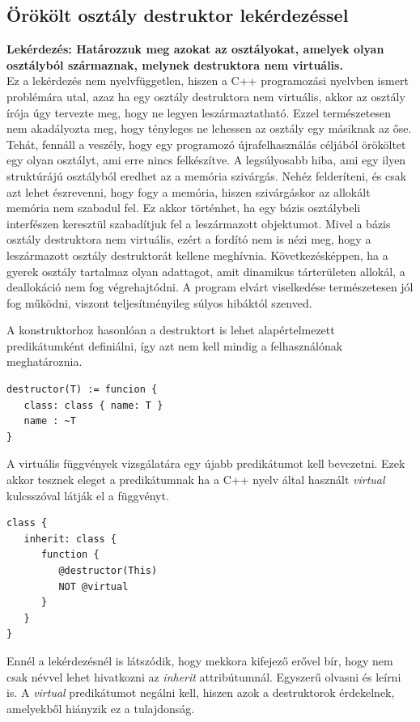 \documentclass[a4paper,12pt]{report}
\begin{document}
\subsection{Örökölt osztály destruktor lekérdezéssel}
\textbf{Lekérdezés: Határozzuk meg azokat az osztályokat, amelyek olyan osztályból származnak, melynek destruktora nem virtuális.}
\\
Ez a lekérdezés nem nyelvfüggetlen, hiszen a C++ programozási nyelvben ismert problémára utal, azaz ha egy osztály destruktora nem virtuális, akkor az osztály írója úgy tervezte meg, hogy ne legyen leszármaztatható. Ezzel természetesen nem akadályozta meg, hogy tényleges ne lehessen az osztály egy másiknak az őse. Tehát, fennáll a veszély, hogy egy programozó újrafelhasználás céljából örököltet egy olyan osztályt, ami erre nincs felkészítve. A legsúlyosabb hiba, ami egy ilyen struktúrájú osztályból eredhet az a memória szivárgás. Nehéz felderíteni, és csak azt lehet észrevenni, hogy fogy a memória, hiszen szivárgáskor az allokált memória nem szabadul fel. Ez akkor történhet, ha egy bázis osztálybeli interfészen keresztül szabadítjuk fel a leszármazott objektumot. Mivel a bázis osztály destruktora nem virtuális, ezért a fordító nem is nézi meg, hogy a leszármazott osztály destruktorát kellene meghívnia. Következésképpen, ha a gyerek osztály tartalmaz olyan adattagot, amit dinamikus tárterületen allokál, a deallokáció nem fog végrehajtódni. A program elvárt viselkedése természetesen jól fog működni, viszont teljesítményileg súlyos hibáktól szenved.
\par A konstruktorhoz hasonlóan a destruktort is lehet alapértelmezett predikátumként definiálni, így azt nem kell mindig a felhasználónak meghatároznia.
\begin{verbatim}
destructor(T) := funcion {
   class: class { name: T }
   name : ~T
}
\end{verbatim}
\par A virtuális függvények vizsgálatára egy újabb predikátumot kell bevezetni. Ezek akkor tesznek eleget a predikátumnak ha a C++ nyelv által használt \textit{virtual} kulcsszóval látják el a függvényt.
\begin{verbatim}
class {
   inherit: class {
      function { 
         @destructor(This) 
         NOT @virtual 
      }
   }
}
\end{verbatim}
\par Ennél a lekérdezésnél is látszódik, hogy mekkora kifejező erővel bír, hogy nem csak névvel lehet hivatkozni az \textit{inherit} attribútumnál. Egyszerű olvasni és leírni is. A \textit{virtual} predikátumot negálni kell, hiszen azok a destruktorok érdekelnek, amelyekből hiányzik ez a tulajdonság.
\end{document}
